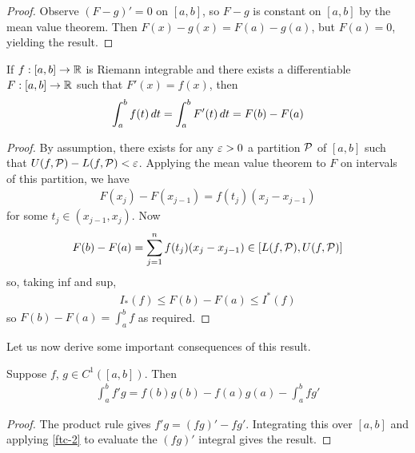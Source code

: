 \documentclass{../../template/note}
\begin{document}
    \begin{proof}
        Observe \((F-g)' = 0\) on \([a, b]\), so \(F-g\) is constant on \([a, b]\) by the mean value theorem. Then \(F(x) - g(x) = F(a) - g(a)\), but \(F(a) = 0\), yielding the result.
    \end{proof}
    
    \begin{theorem}
        \label{ftc-2}
        If \(f: [a, b] \to \mathbb R\) is Riemann integrable and there exists a differentiable \(F: [a, b] \to \mathbb R\) such that \(F'(x) = f(x)\), then
        \begin{align*}
            \int_a^b f(t) \,d{t} = \int_a^b F'(t) \,d{t} = F(b) - F(a)
        \end{align*}
    \end{theorem}
    
    \begin{proof}
        By assumption, there exists for any \(\varepsilon > 0\) a partition \(\mathcal{P}\) of \([a, b]\) such that \(U(f, \mathcal{P}) - L(f, \mathcal{P}) < \varepsilon\). Applying the mean value theorem to \(F\) on intervals of this partition, we have
        \begin{align*}
            F(x_j) - F(x_{j-1}) = f(t_j)(x_j-x_{j-1})
        \end{align*}
        for some \(t_j \in (x_{j-1}, x_j)\). Now
        \begin{align*}
            F(b) - F(a) = \sum_{j=1}^n f(t_j)(x_j-x_{j-1}) \in [L(f, \mathcal{P}), U(f, \mathcal{P})]
        \end{align*}
        so, taking inf and sup,
        \begin{align*}
            I_*(f) \leq F(b)-F(a) \leq I^*(f)
        \end{align*}
        so \(F(b)-F(a) = \int_a^b f\) as required.
    \end{proof}

    
    Let us now derive some important consequences of this result.

    \begin{proposition}
        Suppose \(f\), \(g \in C^1([a, b])\). Then
        \begin{align*}
            \int_a^b f'g = f(b)g(b) - f(a)g(a) - \int_a^b fg'
        \end{align*}
    \end{proposition}
    
    \begin{proof}
        The product rule gives \(f'g = (fg)' - fg'\). Integrating this over \([a, b]\) and applying \cref{ftc-2} to evaluate the \((fg)'\) integral gives the result.
    \end{proof}
    
\end{document}
